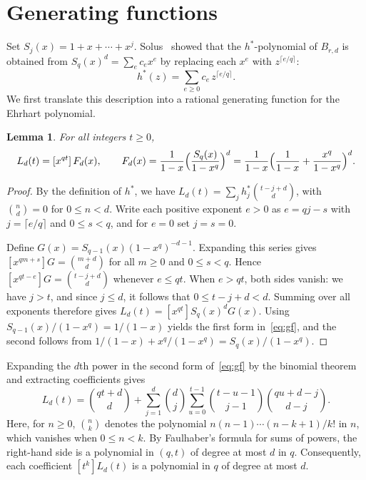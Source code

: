 \documentclass[11pt]{amsart}
\newtheorem{lemma}[theorem]{Lemma}
\theoremstyle{remark}
\begin{document}
\section{Generating functions}\label{sec:gf}

Set $S_j(x)=1+x+\cdots+x^j$. Solus~\cite{Sol} showed that the $h^*$-polynomial
of $B_{r,d}$ is obtained from $S_q(x)^d=\sum_e c_ex^e$ by replacing each
$x^e$ with $z^{\lceil e/q\rceil}$:
\[
 h^*(z)=\sum_{e\ge0}c_e\,z^{\lceil e/q\rceil}.
\]
We first translate this description into a rational generating function for the
Ehrhart polynomial.

\begin{lemma}\label{lem:gf}
For all integers $t\ge0$,
\begin{equation}\label{eq:gf}
 L_d(t)=[x^{qt}]\,F_d(x),\qquad
 F_d(x)=\frac{1}{1-x}\Bigl(\frac{S_q(x)}{1-x^q}\Bigr)^{d}
 =\frac1{1-x}\Bigl(\frac1{1-x}+\frac{x^q}{1-x^q}\Bigr)^{d}.
\end{equation}
\end{lemma}

\begin{proof}
By the definition of $h^*$, we have $L_d(t)=\sum_j h^*_j\binom{t-j+d}{d}$,
with $\binom{n}{d}=0$ for $0\le n<d$. Write each positive exponent $e>0$ as
$e=qj-s$ with $j=\lceil e/q\rceil$ and $0\le s<q$, and for $e=0$ set $j=s=0$.

Define $G(x)=S_{q-1}(x)(1-x^q)^{-d-1}$. Expanding this series gives
$[x^{qm+s}]G=\binom{m+d}{d}$ for all $m\ge0$ and $0\le s<q$. Hence
$[x^{qt-e}]G=\binom{t-j+d}{d}$ whenever $e\le qt$. When $e>qt$, both sides
vanish: we have $j>t$, and since $j\le d$, it follows that $0\le t-j+d<d$.
Summing over all exponents therefore gives $L_d(t)=[x^{qt}]S_q(x)^dG(x)$.
Using $S_{q-1}(x)/(1-x^q)=1/(1-x)$ yields the first form in~\eqref{eq:gf}, and
the second follows from $1/(1-x)+x^q/(1-x^q)=S_q(x)/(1-x^q)$.
\end{proof}

Expanding the $d$th power in the second form of~\eqref{eq:gf} by the binomial
theorem and extracting coefficients gives
\begin{equation}\label{eq:conv}
 L_d(t)=\binom{qt+d}{d}+\sum_{j=1}^{d}\binom dj\sum_{u=0}^{t-1}
 \binom{t-u-1}{j-1}\binom{qu+d-j}{d-j}.
\end{equation}
Here, for $n\ge0$, $\binom{n}{k}$ denotes the polynomial
$n(n-1)\cdots(n-k+1)/k!$ in $n$, which vanishes when $0\le n<k$. By
Faulhaber's formula for sums of powers, the right-hand side is a polynomial in
$(q,t)$ of degree at most $d$ in $q$. Consequently, each coefficient
$[t^k]L_d(t)$ is a polynomial in $q$ of degree at most $d$.
\end{document}
